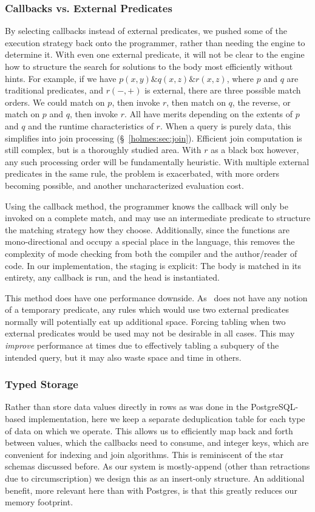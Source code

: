 \subsubsection{Callbacks vs. External Predicates}
\label{holmes:sec:implcall}
By selecting callbacks instead of external predicates, we pushed some of the execution strategy back onto the programmer, rather than needing the engine to determine it.
With even one external predicate, it will not be clear to the engine how to structure the search for solutions to the body most efficiently without hints.
For example, if we have $p(x,y) \& q(x, z) \& r(x, z)$, where $p$ and $q$ are traditional predicates, and $r(-, +)$ is external, there are three possible match orders.
We could match on $p$, then invoke $r$, then match on $q$, the reverse, or match on $p$ and $q$, then invoke $r$.
All have merits depending on the extents of $p$ and $q$ and the runtime characteristics of $r$.
When a query is purely data, this simplifies into join processing (\S~\ref{holmes:sec:join}).
Efficient join computation is still complex, but is a thoroughly studied area.
With $r$ as a black box however, any such processing order will be fundamentally heuristic.
With multiple external predicates in the same rule, the problem is exacerbated, with more orders becoming possible, and another uncharacterized evaluation cost.

Using the callback method, the programmer knows the callback will only be invoked on a complete match, and may use an intermediate predicate to structure the matching strategy how they choose.
Additionally, since the functions are mono-directional and occupy a special place in the language, this removes the complexity of mode checking from both the compiler and the author/reader of code.
In our implementation, the staging is explicit: The body is matched in its entirety, any callback is run, and the head is instantiated.

This method does have one performance downside.
As \sysname\ does not have any notion of a temporary predicate, any rules which would use two external predicates normally will potentially eat up additional space.
Forcing tabling when two external predicates would be used may not be desirable in all cases.
This may \emph{improve} performance at times due to effectively tabling a subquery of the intended query, but it may also waste space and time in others.

\subsubsection{Typed Storage}
Rather than store data values directly in rows as was done in the PostgreSQL-based implementation, here we keep a separate deduplication table for each type of data on which we operate.
This allows us to efficiently map back and forth between values, which the callbacks need to consume, and integer keys, which are convenient for indexing and join algorithms. 
This is reminiscent of the star schemas discussed before.
As our system is mostly-append (other than retractions due to circumscription) we design this as an insert-only structure.
An additional benefit, more relevant here than with Postgres, is that this greatly reduces our memory footprint.

